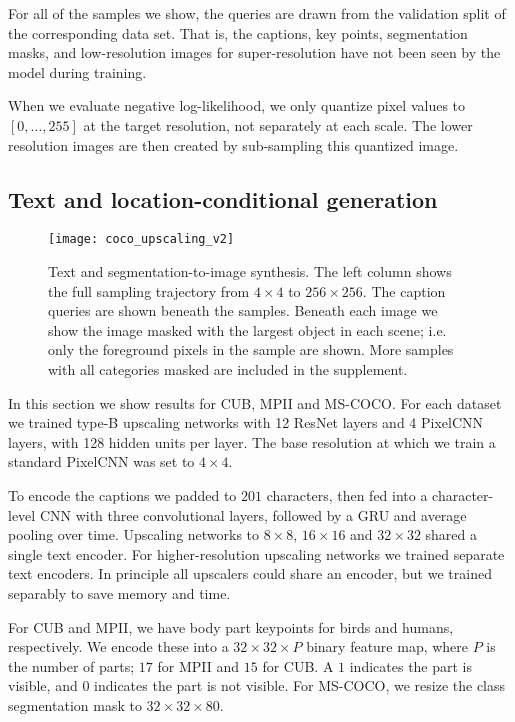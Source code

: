 \documentclass{article}
\begin{document}
For all of the samples we show, the queries are drawn from the validation split of the corresponding data set.
That is, the captions, key points, segmentation masks, and low-resolution images for super-resolution have not been seen by the model during training.


When we evaluate negative log-likelihood, we only quantize pixel values to $[0,...,255]$ at the target resolution, not separately at each scale.
The lower resolution images are then created by sub-sampling this quantized image.

\subsection{Text and location-conditional generation}


\begin{figure*}[h!]
\centering
\texttt{[image: coco\_upscaling\_v2]}
\vspace{-0.25in}
\caption{Text and segmentation-to-image synthesis. The left column shows the full sampling trajectory from $4 \times 4$ to $256 \times 256$. The caption queries are shown beneath the samples. Beneath each image we show the image masked with the largest object in each scene; i.e. only the foreground pixels in the sample are shown. More samples with all categories masked are included in the supplement.\label{fig:coco}}
\end{figure*}

In this section we show results for CUB, MPII and MS-COCO.
For each dataset we trained type-B upscaling networks with 12 ResNet layers and 4 PixelCNN layers, with 128 hidden units per layer.
The base resolution at which we train a standard PixelCNN was set to $4 \times 4$.

To encode the captions we padded to $201$ characters, then fed into a character-level CNN with three convolutional layers, followed by a GRU and average pooling over time.
Upscaling networks to $8 \times 8$, $16 \times 16$ and $32 \times 32$ shared a single text encoder.
For higher-resolution upscaling networks we trained separate text encoders.
In principle all upscalers could share an encoder, but we trained separably to save memory and time.

For CUB and MPII, we have body part keypoints for birds and humans, respectively.
We encode these into a $32 \times 32 \times P$ binary feature map, where $P$ is the number of parts; $17$ for MPII and $15$ for CUB.
A $1$ indicates the part is visible, and $0$ indicates the part is not visible.
For MS-COCO, we resize the class segmentation mask to $32 \times 32 \times 80$.
\end{document}
